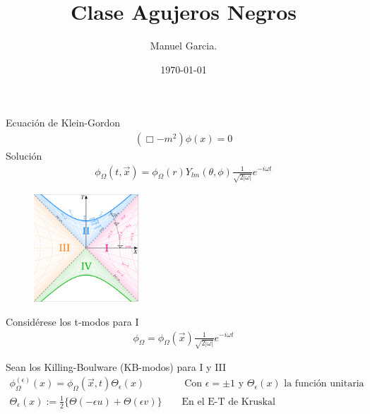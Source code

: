 \documentclass{article}
\title{Clase Agujeros Negros }
\author{Manuel Garcia.}
\date{\today}
\begin{document}
\maketitle

\section{}
Ecuación de Klein-Gordon 
\begin{gather*}
  (\Box - m^2) \phi(x) = 0 
\end{gather*}
Solución 
\begin{gather*}
   \phi_\Omega (t,\vec x) = \phi_\Omega (r) Y _{lm } (\theta,\phi) \frac{1}{\sqrt{2 \left|\omega \right|} } e ^ {- i \omega t }
\end{gather*}

\hfill 

\hfill 

\hfill 

\begin{figure}[H]
  \begin{center}
    \includegraphics[width=0.35\textwidth]{kruskal.png}
  \end{center}
\end{figure}



Considérese los t-modos para I 
\begin{gather*}
  \phi _\Omega = \phi_\Omega (\vec x) \frac{1}{\sqrt{2 \left|\omega\right|} } e ^ {- i \omega t } 
\end{gather*}

Sean los Killing-Boulware (KB-modos) para I y III
\begin{gather*}
  \phi_\Omega ^ {(\epsilon)}(x) = \phi_\Omega (\vec x, t) \Theta_\epsilon (x)
  \qquad \qquad \text{Con } \epsilon= \pm 1 \text{ y } \Theta_\epsilon(x) \text{ la función unitaria }   \\
  \Theta_\epsilon(x) := \frac{1}{2} \{\Theta(-\epsilon u ) + \Theta(\epsilon v )  \} \qquad \text{En el E-T de Kruskal }
\end{gather*}
\end{document}
